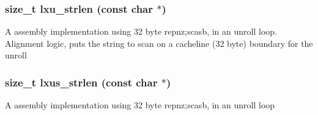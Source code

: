 \subsubsection{\setlength{\rightskip}{0pt plus 5cm}size\_\-t lxu\_\-strlen (const char $\ast$)}\label{strlen_2def__test_8h_a9}


A assembly implementation using 32 byte repnz;scasb, in an unroll loop. Alignment logic, puts the string to scan on a cacheline (32 byte) boundary for the unroll 
\subsubsection{\setlength{\rightskip}{0pt plus 5cm}size\_\-t lxus\_\-strlen (const char $\ast$)}\label{strlen_2def__test_8h_a8}


A assembly implementation using 32 byte repnz;scasb, in an unroll loop 